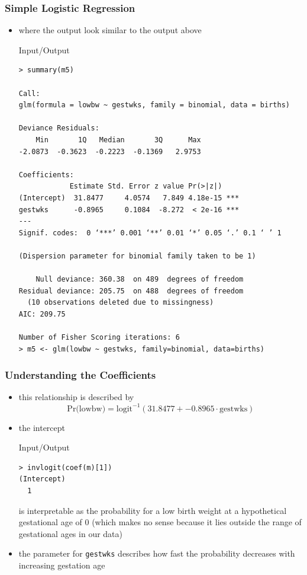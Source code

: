 \begin{frame}[fragile]\frametitle{Simple Logistic Regression}
\begin{itemize}
\item where the output look similar to the output above
  \begin{exampleblock}{Input/Output}\scriptsize
\begin{verbatim}
> summary(m5)

Call:
glm(formula = lowbw ~ gestwks, family = binomial, data = births)

Deviance Residuals: 
    Min       1Q   Median       3Q      Max  
-2.0873  -0.3623  -0.2223  -0.1369   2.9753  

Coefficients:
            Estimate Std. Error z value Pr(>|z|)    
(Intercept)  31.8477     4.0574   7.849 4.18e-15 ***
gestwks      -0.8965     0.1084  -8.272  < 2e-16 ***
---
Signif. codes:  0 ‘***’ 0.001 ‘**’ 0.01 ‘*’ 0.05 ‘.’ 0.1 ‘ ’ 1

(Dispersion parameter for binomial family taken to be 1)

    Null deviance: 360.38  on 489  degrees of freedom
Residual deviance: 205.75  on 488  degrees of freedom
  (10 observations deleted due to missingness)
AIC: 209.75

Number of Fisher Scoring iterations: 6
> m5 <- glm(lowbw ~ gestwks, family=binomial, data=births)
\end{verbatim}
  \end{exampleblock}
\end{itemize}
\end{frame}


\begin{frame}[fragile]\frametitle{Understanding the Coefficients}
\begin{itemize}
\item this relationship is described by $$\mbox{Pr(lowbw)}=\mbox{logit}^{-1}(31.8477 + -0.8965 \cdot \mbox{gestwks}) $$
\item the intercept
  \begin{exampleblock}{Input/Output}
\begin{verbatim}
> invlogit(coef(m)[1])
(Intercept) 
  1
\end{verbatim}
  \end{exampleblock}
is interpretable as the probability for a low birth weight at a hypothetical gestational age of 0 (which makes no sense because it lies outside the range of gestational ages in our data)
\item the parameter for \texttt{gestwks} describes how fast the probability decreases with increasing gestation age
\end{itemize}
\end{frame}

